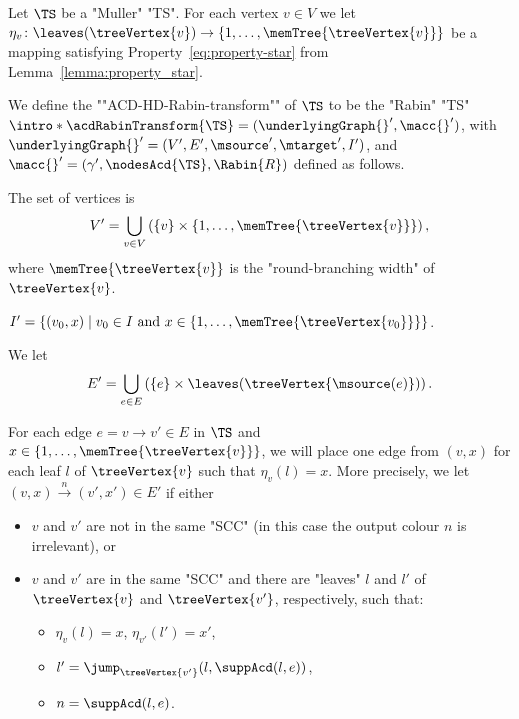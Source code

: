 \documentclass[10pt,a4paper]{amsart}
\let\ab\allowbreak
\renewcommand{\gg}{\gamma}
\newcommand{\tand}{\text{ and }}
\newcommand{\re}[1]{\xrightarrow{#1}}
\begin{document}
\begin{definition}\label{def-ACD:RabinHDTransformationACD}
	Let $\TS$ be a "Muller" "TS". %
	For each vertex $v\in V$ we let $\eta_v \colon \leaves(\treeVertex{v}) \to \{1,\dots, \memTree{\treeVertex{v}}\}$ be a mapping satisfying Property~\eqref{eq:property-star} from Lemma~\ref{lemma:property_star}.
	
	\AP We define the ""ACD-HD-Rabin-transform"" of $\TS$ to be the "Rabin" "TS"	 $\intro*\acdRabinTransform{\TS} = (\underlyingGraph{}', \macc{}')$, with $\underlyingGraph{}' = (V', E', \msource', \mtarget', I')$, and $\macc{}' = (\gg',\ab \nodesAcd{\TS}, \ab \Rabin{R})$ defined as follows.
	\begin{description}
		  \setlength\itemsep{2mm}
		\item[Vertices.] The set of vertices is \[V' = \bigcup_{v\in V} \left( \{v\} \times \{1,\dots, \memTree{\treeVertex{v}}\} \right),\]
		where $\memTree{\treeVertex{v}}$ is the "round-branching width" of $\treeVertex{v}$.
		
		\item[Initial vertices.] $I' = \{ (v_0, x) \mid v_0\in I \tand x \in \{1,\dots, \memTree{\treeVertex{v_0}}\} \}$.
		
		\item[Edges and output colours.] We let \[E' = \bigcup_{e\in E} \left( \{e\} \times \leaves(\treeVertex{\msource(e)})\right).\]
		
		For each edge $e = v\re{} v'\in E$ in $\TS$ and $x\in \{1,\dots, \memTree{\treeVertex{v}}\}$, we will place one edge from $(v, x)$ for each leaf $l$ of $\treeVertex{v}$ such that $\eta_v(l) = x$.
		More precisely, we let $(v, x) \re{n} (v',x')\in E'$ if either 
		\begin{itemize}
			\item $v$ and $v'$ are not in the same "SCC" (in this case the output colour $n$ is irrelevant), or
			\item $v$ and $v'$ are in the same "SCC" and there are "leaves" $l$ and $l'$ of $\treeVertex{v}$ and $\treeVertex{v'}$, respectively, such that:
			\begin{itemize}
				\item $\eta_v(l) = x$, $\eta_{v'}(l') = x'$,
				\item $l' = \jump_{\treeVertex{v'}}(l, \suppAcd(l, e))$,
				\item $n = \suppAcd(l,e)$.
			\end{itemize}
		\end{itemize}
		

\end{description}
\end{definition}
\end{document}
